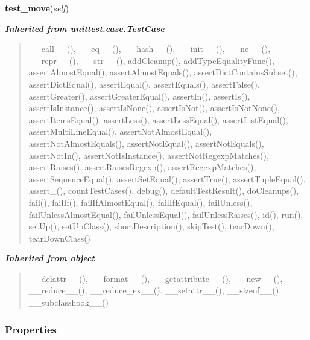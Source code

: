     \vspace{0.5ex}

\hspace{.8\funcindent}\begin{boxedminipage}{\funcwidth}

    \raggedright \textbf{test\_move}(\textit{self})

\setlength{\parskip}{2ex}
\setlength{\parskip}{1ex}
    \end{boxedminipage}


\large{\textbf{\textit{Inherited from unittest.case.TestCase}}}

\begin{quote}
\_\_call\_\_(), \_\_eq\_\_(), \_\_hash\_\_(), \_\_init\_\_(), \_\_ne\_\_(), \_\_repr\_\_(), \_\_str\_\_(), addCleanup(), addTypeEqualityFunc(), assertAlmostEqual(), assertAlmostEquals(), assertDictContainsSubset(), assertDictEqual(), assertEqual(), assertEquals(), assertFalse(), assertGreater(), assertGreaterEqual(), assertIn(), assertIs(), assertIsInstance(), assertIsNone(), assertIsNot(), assertIsNotNone(), assertItemsEqual(), assertLess(), assertLessEqual(), assertListEqual(), assertMultiLineEqual(), assertNotAlmostEqual(), assertNotAlmostEquals(), assertNotEqual(), assertNotEquals(), assertNotIn(), assertNotIsInstance(), assertNotRegexpMatches(), assertRaises(), assertRaisesRegexp(), assertRegexpMatches(), assertSequenceEqual(), assertSetEqual(), assertTrue(), assertTupleEqual(), assert\_(), countTestCases(), debug(), defaultTestResult(), doCleanups(), fail(), failIf(), failIfAlmostEqual(), failIfEqual(), failUnless(), failUnlessAlmostEqual(), failUnlessEqual(), failUnlessRaises(), id(), run(), setUp(), setUpClass(), shortDescription(), skipTest(), tearDown(), tearDownClass()
\end{quote}

\large{\textbf{\textit{Inherited from object}}}

\begin{quote}
\_\_delattr\_\_(), \_\_format\_\_(), \_\_getattribute\_\_(), \_\_new\_\_(), \_\_reduce\_\_(), \_\_reduce\_ex\_\_(), \_\_setattr\_\_(), \_\_sizeof\_\_(), \_\_subclasshook\_\_()
\end{quote}


  \subsubsection{Properties}


